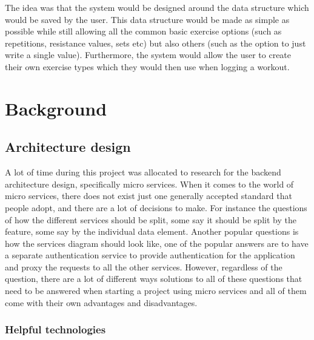 \documentclass[twocolumn]{article}
\begin{document}
The idea was that the system would be designed around the data structure which would be saved by the user. This data structure would be made as simple as possible while still allowing all the common basic exercise options (such as repetitions, resistance values, sets etc) but also others (such as the option to just write a single value). Furthermore, the system would allow the user to create their own exercise types which they would then use when logging a workout. 

\section{Background}
\vspace{-1ex}

\subsection{Architecture design}

A lot of time during this project was allocated to research for the backend architecture design, specifically micro services. When it comes to the world of micro services, there does not exist just one generally accepted standard that people adopt, and there are a lot of decisions to make. For instance the questions of how the different services should be split, some say it should be split by the feature, some say by the individual data element. Another popular questions is how the services diagram should look like, one of the popular answers are to have a separate authentication service to provide authentication for the application and proxy the requests to all the other services. However, regardless of the question, there are a lot of different ways solutions to all of these questions that need to be answered when starting a project using micro services and all of them come with their own advantages and disadvantages. 

\subsubsection{Helpful technologies}
\end{document}

